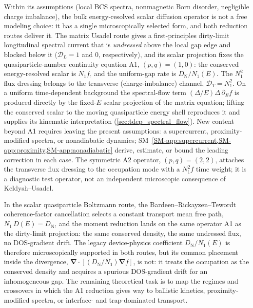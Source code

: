 \documentclass[
  aps,
  prb,
  preprint,
  superscriptaddress,
  longbibliography,
  nofootinbib
]{revtex4-2}
\newcommand{\bnabla}{\boldsymbol{\nabla}}
\newcommand{\DOS}{N_1}
\newcommand{\DN}{D_{\mathrm{N}}}
\newcommand{\DE}{D(E)}
\begin{document}
Within its assumptions (local BCS spectra, nonmagnetic Born disorder,
negligible charge imbalance), the bulk energy-resolved scalar diffusion
operator is not a free modeling choice: it has a single
microscopically selected form, and both reduction routes deliver it.
The matrix Usadel route gives a
first-principles dirty-limit longitudinal spectral current that is
\emph{undressed} above the local gap edge and blocked below it
(\(\mathcal{D}_L=1\) and \(0\), respectively), and its scalar projection
fixes the quasiparticle-number
continuity equation A1, \((p,q)=(1,0)\): the conserved
energy-resolved scalar is \(\DOS f\), and the uniform-gap rate is
\(\DN/\DOS(E)\). The \(\DOS^2\) flux dressing belongs to the transverse
(charge-imbalance) channel, \(\mathcal{D}_T=\DOS^2\). On a uniform
time-dependent background the spectral-flow term
\((\Delta/E)\dot\Delta\,\partial_E f\) is produced directly by the
fixed-\(E\) scalar projection of the matrix equation; lifting the conserved
scalar to the moving quasiparticle energy shell reproduces it and supplies
its kinematic interpretation
(\cref{sec:tdep_spectral_flow}). New content
beyond A1 requires leaving the present assumptions: a supercurrent,
proximity-modified spectra, or nonadiabatic dynamics;
SM~\cref{SM-app:supercurrent,SM-app:proximity,SM-app:nonadiabatic}
derive, estimate, or bound the leading correction in each case. The symmetric A2
operator, \((p,q)=(2,2)\), attaches the transverse flux dressing to the
occupation mode with a \(\DOS^2 f\) time weight; it is a diagnostic
test operator, not an independent microscopic consequence of Keldysh--Usadel.

In the scalar quasiparticle Boltzmann route, the
Bardeen--Rickayzen--Tewordt coherence-factor cancellation selects a
constant transport mean free path, \(\DOS\,\DE=\DN\), and the
moment reduction lands on the same operator A1 as the dirty-limit
projection: the same conserved density, the same undressed flux, no
DOS-gradient drift. The legacy device-physics coefficient
\(\DN/\DOS(E)\) is therefore microscopically supported in both routes,
but its common placement inside the divergence,
\(\bnabla\cdot[(\DN/\DOS)\bnabla f]\), is not: it treats the occupation
as the conserved density and acquires a spurious DOS-gradient drift for
an inhomogeneous gap. The remaining theoretical
task is to map the regimes and crossovers in which the A1 reduction
gives way to ballistic kinetics, proximity-modified spectra, or
interface- and trap-dominated transport.
\end{document}
